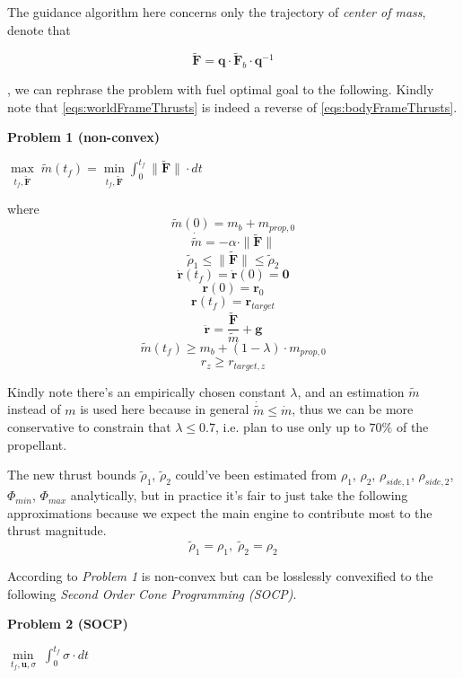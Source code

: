 \documentclass[10pt]{elsarticle}
\begin{document}
The guidance algorithm here concerns only the trajectory of \textit{center of mass}, denote that

\begin{equation} \label{eqs:worldFrameThrusts}
\tilde{\boldsymbol{F}} = \boldsymbol{q} \cdot \tilde{\boldsymbol{F}}_b \cdot \boldsymbol{q}^{-1} 
\end{equation}

, we can rephrase the problem with fuel optimal goal to the following. Kindly note that \eqref{eqs:worldFrameThrusts} is indeed a reverse of \eqref{eqs:bodyFrameThrusts}. 

\textbf{Problem 1 (non-convex)} \label{prob:p1}

$\underset{t_f, \tilde{\boldsymbol{F}}}{\max} \; \tilde{m}(t_f) = \underset{t_f, \tilde{\boldsymbol{F}}}{\min} \int_{0}^{t_f} \|\tilde{\boldsymbol{F}}\| \cdot dt$

where
\[
\tilde{m}(0) = m_b + m_{prop,0}
\]
\[
\dot{\tilde{m}} = -\alpha \cdot \|\tilde{\boldsymbol{F}}\|
\]
\[
\tilde{\rho}_1 \le \|\tilde{\boldsymbol{F}}\| \le \tilde{\rho}_2 
\]
\[
\dot{\boldsymbol{r}}(t_f) = \dot{\boldsymbol{r}}(0) = \boldsymbol{0}
\]
\[
\boldsymbol{r}(0) = \boldsymbol{r}_0
\]
\[
\boldsymbol{r}(t_f) = \boldsymbol{r}_{target}
\]
\[
\ddot{\boldsymbol{r}} = \frac{\tilde{\boldsymbol{F}}}{\tilde{m}} + \boldsymbol{g}
\]
\[
\tilde{m}(t_f) \ge m_b + (1 - \lambda) \cdot m_{prop,0}
\]
\[
r_z \ge r_{target,z} 
\]

Kindly note there's an empirically chosen constant $\lambda$, and an estimation $\tilde{m}$ instead of $m$ is used here because in general $\dot{\tilde{m}} \le \dot{m}$, thus we can be more conservative to constrain that $\lambda \le 0.7$, i.e. plan to use only up to $70\%$ of the propellant. 

The new thrust bounds $\tilde{\rho}_1$, $\tilde{\rho}_2$ could've been estimated from $\rho_1$, $\rho_2$, $\rho_{side,1}$, $\rho_{side,2}$, $\Phi_{min}$, $\Phi_{max}$ analytically, but in practice it's fair to just take the following approximations because we expect the main engine to contribute most to the thrust magnitude.
\[
\tilde{\rho}_1 = \rho_1, \; \tilde{\rho}_2 = \rho_2
\]


According to \cite{cvxpow, losslesscvx} \textit{Problem 1} is non-convex but can be losslessly convexified to the following \textit{Second Order Cone Programming (SOCP)}\cite{alizadeh2003second}.

\textbf{Problem 2 (SOCP)} \label{prob:p2}

$\underset{t_f, \boldsymbol{u}, \sigma}{\min} \; \int_{0}^{t_f} \sigma \cdot dt$
\end{document}
